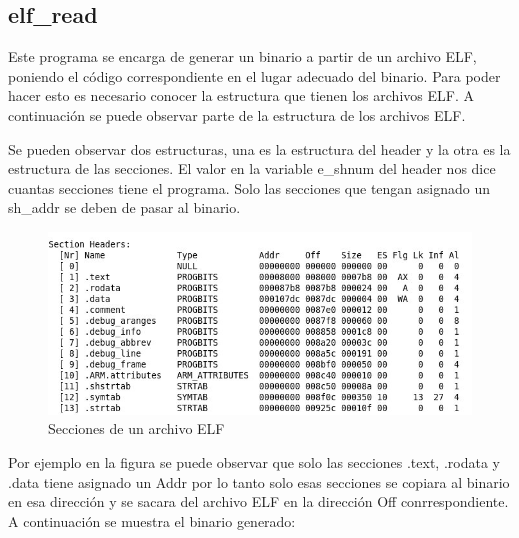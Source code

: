 \subsection{elf\_read}

Este programa se encarga de generar un binario a partir de un archivo ELF, poniendo el c\'odigo correspondiente en el lugar adecuado del binario. Para poder hacer esto es necesario conocer la estructura que tienen los archivos ELF. A continuaci\'on se puede observar parte de la estructura de los archivos ELF.\medskip

\lstset{language=C}


Se pueden observar dos estructuras, una es la estructura del header y la otra es la estructura de las secciones. El valor en la variable e\_shnum del header nos dice cuantas secciones tiene el programa. Solo las secciones que tengan asignado un sh\_addr se deben de pasar al binario.\medskip

\begin{figure}[H]
\centering
\includegraphics[scale=0.5]{secciones}
\caption{Secciones de un archivo ELF}\label{fig:secciones}
\end{figure}

Por ejemplo en la figura se puede observar que solo las secciones .text, .rodata y .data tiene asignado un Addr por lo tanto solo esas secciones se copiara al binario en esa direcci\'on y se sacara del archivo ELF en la direcci\'on Off conrrespondiente. A continuaci\'on se muestra el binario generado:\medskip


